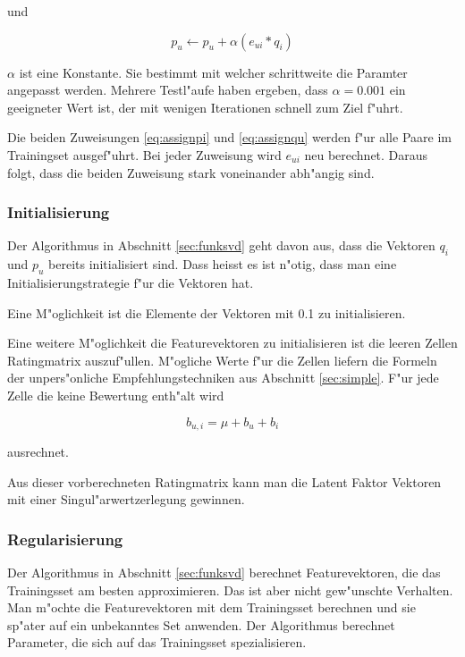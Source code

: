 \documentclass[a4paper, 12pt]{article}
\begin{document}
und

\begin{equation}
  \label{eq:assignqu}
 p_u \leftarrow p_u + \alpha (e_{ui} * q_i)
\end{equation}

$\alpha$ ist eine Konstante. Sie bestimmt mit welcher schrittweite die Paramter angepasst werden. Mehrere Testl"aufe haben ergeben, dass $\alpha = 0.001$ ein geeigneter Wert ist, der mit wenigen Iterationen schnell zum Ziel f"uhrt.

Die beiden Zuweisungen \ref{eq:assignpi} und \ref{eq:assignqu} werden f"ur alle Paare im Trainingset ausgef"uhrt. Bei jeder Zuweisung wird $e_{ui}$ neu berechnet. Daraus folgt, dass die beiden Zuweisung stark voneinander abh"angig sind.

\subsubsection{Initialisierung}
\label{sec:init}

Der Algorithmus in Abschnitt \ref{sec:funksvd} geht davon aus, dass die Vektoren $q_i$ und $p_u$ bereits initialisiert sind. Dass heisst es ist n"otig, dass man eine Initialisierungstrategie f"ur die Vektoren hat. 

Eine M"oglichkeit ist die Elemente der Vektoren mit 0.1 zu initialisieren. 

Eine weitere M"oglichkeit die Featurevektoren zu initialisieren ist die leeren Zellen Ratingmatrix auszuf"ullen. M"ogliche Werte f"ur die Zellen liefern die Formeln der unpers"onliche Empfehlungstechniken aus Abschnitt \ref{sec:simple}. F"ur jede Zelle die keine Bewertung enth"alt wird 

\begin{equation}
  \label{eq:mu2}
    b_{u,i} = \mu + b_u + b_i
\end{equation}

ausrechnet.

Aus dieser vorberechneten Ratingmatrix kann man die Latent Faktor Vektoren mit einer Singul"arwertzerlegung gewinnen.

\subsubsection{Regularisierung}
\label{sec:regularization}

Der Algorithmus in Abschnitt \ref{sec:funksvd} berechnet Featurevektoren, die das Trainingsset am besten approximieren. Das ist aber nicht gew"unschte Verhalten. Man m"ochte die Featurevektoren mit dem Trainingsset berechnen und sie sp"ater auf ein unbekanntes Set anwenden. Der Algorithmus berechnet Parameter, die sich auf das Trainingsset spezialisieren. 
\end{document}
